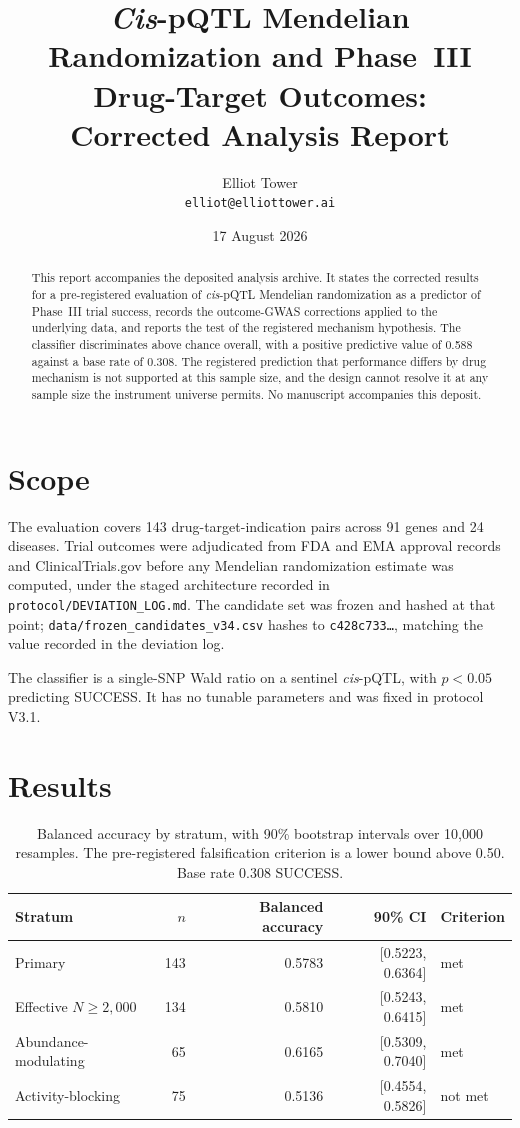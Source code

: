 \documentclass[11pt,a4paper]{article}
\title{\emph{Cis}-pQTL Mendelian Randomization and Phase~III Drug-Target Outcomes:\\
Corrected Analysis Report}
\author{Elliot Tower\\ \texttt{elliot@elliottower.ai}}
\date{17 August 2026}
\begin{document}
\maketitle

\begin{abstract}
\noindent
This report accompanies the deposited analysis archive. It states the corrected results for
a pre-registered evaluation of \emph{cis}-pQTL Mendelian randomization as a predictor of
Phase~III trial success, records the outcome-GWAS corrections applied to the underlying
data, and reports the test of the registered mechanism hypothesis. The classifier
discriminates above chance overall, with a positive predictive value of 0.588 against a
base rate of 0.308. The registered prediction that performance differs by drug mechanism is
not supported at this sample size, and the design cannot resolve it at any sample size the
instrument universe permits. No manuscript accompanies this deposit.
\end{abstract}

\section{Scope}

The evaluation covers 143 drug-target-indication pairs across 91 genes and 24 diseases.
Trial outcomes were adjudicated from FDA and EMA approval records and ClinicalTrials.gov
before any Mendelian randomization estimate was computed, under the staged architecture
recorded in \texttt{protocol/DEVIATION\_LOG.md}. The candidate set was frozen and hashed at
that point; \texttt{data/frozen\_candidates\_v34.csv} hashes to \texttt{c428c733\ldots},
matching the value recorded in the deviation log.

The classifier is a single-SNP Wald ratio on a sentinel \emph{cis}-pQTL, with $p < 0.05$
predicting SUCCESS. It has no tunable parameters and was fixed in protocol V3.1.

\section{Results}

\begin{table}[h]
\centering
\begin{tabular}{lrrrl}
\toprule
Stratum & $n$ & Balanced accuracy & 90\% CI & Criterion \\
\midrule
Primary & 143 & 0.5783 & [0.5223, 0.6364] & met \\
Effective $N \geq 2{,}000$ & 134 & 0.5810 & [0.5243, 0.6415] & met \\
Abundance-modulating & 65 & 0.6165 & [0.5309, 0.7040] & met \\
Activity-blocking & 75 & 0.5136 & [0.4554, 0.5826] & not met \\
\bottomrule
\end{tabular}
\caption{Balanced accuracy by stratum, with 90\% bootstrap intervals over 10{,}000
resamples. The pre-registered falsification criterion is a lower bound above 0.50.
Base rate 0.308 SUCCESS.}
\end{table}
\end{document}
